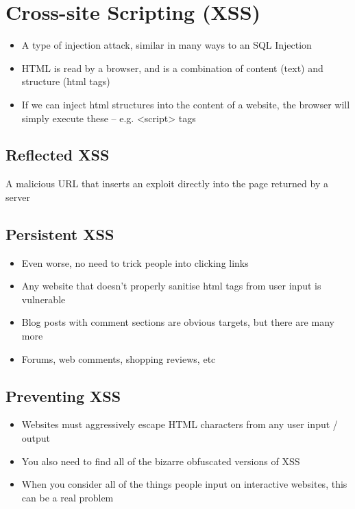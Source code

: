 \documentclass{article}
\begin{document}
\section{Cross-site Scripting (XSS)}
\begin{itemize}
	\item A type of injection attack, similar in many ways to an SQL Injection 
	\item HTML is read by a browser, and is a combination of content (text) and structure (html tags) 
	\item If we can inject html structures into the content of a website, the browser will simply execute these – e.g. <script> tags
\end{itemize}

\subsection{Reflected XSS}
\begin{flushleft}
A malicious URL that inserts an exploit directly into the page returned by a server
\end{flushleft}

\subsection{Persistent XSS}
\begin{itemize}
	\item Even worse, no need to trick people into clicking links 
	\item Any website that doesn’t properly sanitise html tags from user input is vulnerable 
	\item Blog posts with comment sections are obvious targets, but there are many more 
	\item Forums, web comments, shopping reviews, etc
\end{itemize}

\subsection{Preventing XSS}
\begin{itemize}
	\item Websites must aggressively escape HTML characters from any user input / output 
	\item You also need to find all of the bizarre obfuscated versions of XSS 
	\item When you consider all of the things people input on interactive websites, this can be a real problem
\end{itemize}
\end{document}
